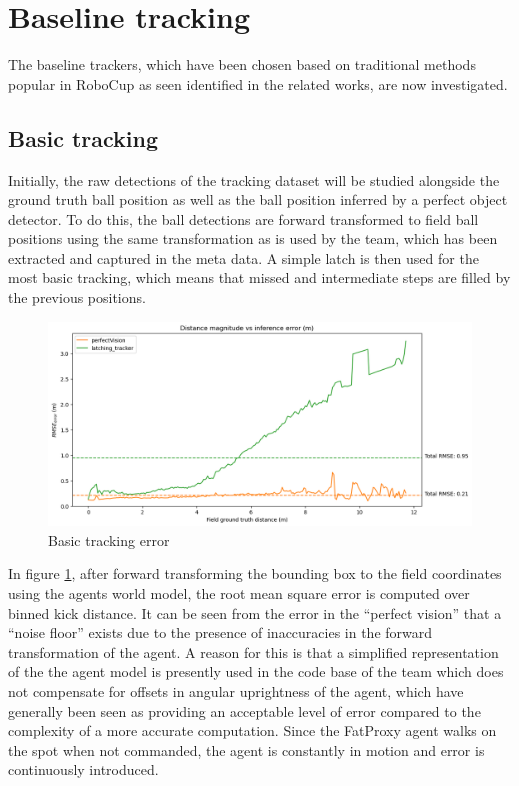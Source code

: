 \documentclass[a4paper,twoside,12pt]{report}
\begin{document}
\section{Baseline tracking}

The baseline trackers, which have been chosen based on traditional methods popular in RoboCup as seen identified in the related works, are now investigated.

\subsection{Basic tracking}

Initially, the raw detections of the tracking dataset will be studied alongside the ground truth ball position as well as the ball position inferred by a perfect object detector. To do this, the ball detections are forward transformed to field ball positions using the same transformation as is used by the team, which has been extracted and captured in the meta data. A simple latch is then used for the most basic tracking, which means that missed and intermediate steps are filled by the previous positions.

\begin{figure}[h!]
\begin{center}
\includegraphics[width=14cm]{images/raw_error.png}
\caption{Basic tracking error}
\label{fig:rawerror}
\end{center}
\end{figure}

In figure \ref{fig:rawerror}, after forward transforming the bounding box to the field coordinates using the agents world model, the root mean square error is computed over binned kick distance. It can be seen from the error in the ``perfect vision'' that a ``noise floor'' exists due to the presence of inaccuracies in the forward transformation of the agent. A reason for this is that a simplified representation of the the agent model is presently used in the code base of the team which does not compensate for offsets in angular uprightness of the agent, which have generally been seen as providing an acceptable level of error compared to the complexity of a more accurate computation. Since the FatProxy agent walks on the spot when not commanded, the agent is constantly in motion and error is continuously introduced.
\end{document}
